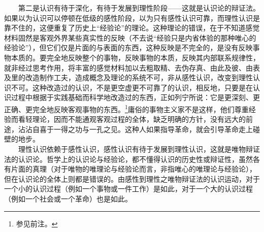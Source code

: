 \documentclass[cn,11pt,chinese]{elegantbook}
\begin{document}
　　第二是认识有待于深化，有待于发展到理性阶段——这就是认识论的辩证法。如果以为认识可以停顿在低级的感性阶段，以为只有感性认识可靠，而理性认识是靠不住的，这便重复了历史上“经验论”的理论。这种理论的错误，在于不知道感觉材料固然是客观外界某些真实性的反映（不去说“经验只是内省体验的那种唯心的经验论”），但它们仅是片面的与表面的东西，这种反映是不完全的，是没有反映事物本质的。要完全地反映整个的事物，反映事物的本质，反映其内部联系规律性，就非经过思考作用，将丰富的感觉材料加以去粗取精、去伪存真、由此及彼、由表及里的改造制作工夫，造成概念及理论的系统不可，非从感性认识，改变到理性认识不可。这种改造过的认识，不是更空虚更不可靠了的认识，相反地，只要是在认识过程中根据于实践基础而科学地改造过的东西，正如列宁所说：它是更深刻、更正确、更完全地反映客观事物的东西。\footnote[22]{ 参见前注。}庸俗的事物主义家不是这样，他们尊重经验而看轻理论，因而不能通观客观过程的全体，缺乏明确的方针，没有远大的前途，沾沾自喜于一得之功与一孔之见。这种人如果指导革命，就会引导革命走上碰壁的地步。\\
　　理性认识依赖于感性认识，感性认识有待于发展到理性认识，这就是唯物辩证法的认识论。哲学上的认识论与经验论，都不懂得认识的历史性或辩证性，虽然各有片面的真理（对于唯物的唯理论与经验论而言，非指唯心的唯理论与经验论），但在认识论的全体上则都是错误的。由感性到理性之唯物辩证法的认识运动，对于一个小的认识过程（例如一个事物或一件工作）是如此，对于一个大的认识过程（例如一个社会或一个革命）也是如此。\\
\end{document}
